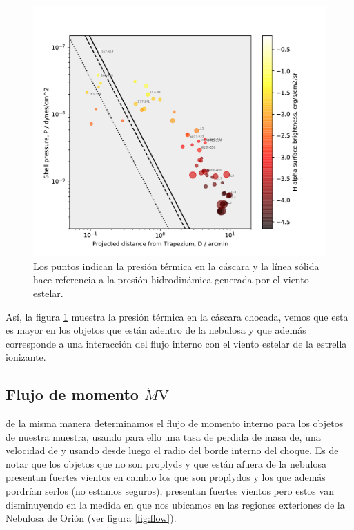 \documentclass{article}
\begin{document}
\begin{figure}
  \centering
  \includegraphics[width=\linewidth, clip]{luis-programas/will-Pshell-vs-D.pdf}
  \caption{Los puntos indican la presión térmica en la cáscara y la línea sólida hace referencia a la presión hidrodinámica generada por el viento estelar.}
 \label{fig:pressure}
\end{figure}

Así, la figura \ref{fig:pressure} muestra la presión térmica en la cáscara chocada, vemos que esta es mayor en los objetos que están adentro de la nebulosa y que además corresponde a una interacción del flujo interno con el viento estelar de la estrella ionizante.


\subsection{ Flujo de momento \(\dot{M}\text{V}\) }
\label{sec:momentum}

de la misma manera determinamos el flujo de momento interno para los objetos de nuestra muestra, usando para ello una tasa de perdida de masa de, una velocidad de y usando desde luego el radio del borde interno del choque. Es de notar que los objetos que no son proplyds y que están afuera de la nebulosa presentan fuertes vientos en cambio los que son proplydos y los que además pordrían serlos (no estamos seguros), presentan fuertes vientos pero estos van disminuyendo en la medida en que nos ubicamos en las regiones exteriones de la Nebulosa de Orión (ver figura \ref{fig:flow}).\\ 
\end{document}
